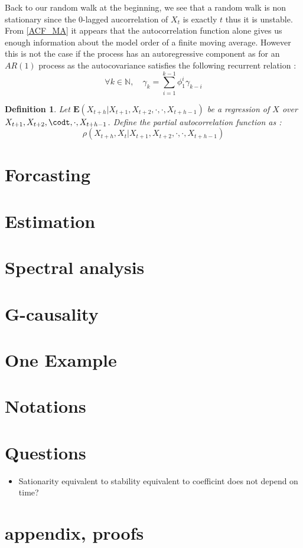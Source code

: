 \documentclass{article}
\newtheorem{Def}{Definition}[section]
\begin{document}
Back to our random walk at the beginning, we see that a random walk is non stationary since the 0-lagged aucorrelation of $X_t$ is exactly $t$ thus it is unstable.
From \ref{ACF_MA} it appears that the autocorrelation function alone gives us enough information about the model order of a finite moving average. However this is not the case if the process has an autoregressive component as for an $AR(1)$ process as the autocovariance satisfies the following recurrent relation : 
\begin{equation*}
    \forall k\in\mathds{N},\quad\gamma_k=\sum_{i=1}^{k-1}\phi_1^i\gamma_{k-i}
\end{equation*}
\begin{Def}
Let $\mathbf{E}(X_{t+h}|X_{t+1},X_{t+2},\cdot,\cdot,X_{t+h-1})$ be a regression of $X$ over $X_{t+1},X_{t+2},\codt,\cdot,X_{t+h-1}$. Define the partial autocorrelation function as :
\begin{equation*}
    \rho(X_{t+h},X_t|X_{t+1},X_{t+2},\cdot,\cdot,X_{t+h-1})
\end{equation*}
\end{Def}
\section{Forcasting}
\section{Estimation}
\section{Spectral analysis}
\section{G-causality}
\section{One Example}
\section{Notations}
\section{Questions}
\begin{itemize}
\item Sationarity equivalent to stability equivalent to coefficint does not depend on time?
\end{itemize}
\section{appendix, proofs}
\end{document}
